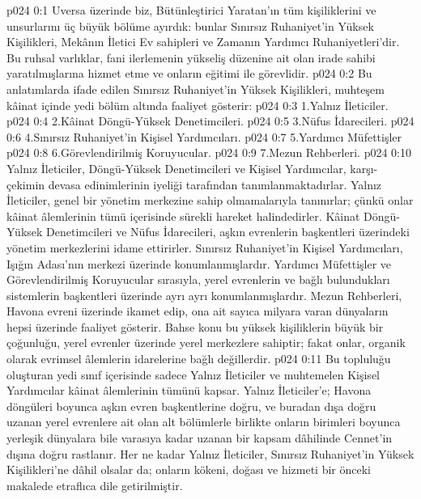 \vs p024 0:1 Uversa üzerinde biz, Bütünleştirici Yaratan’ın tüm kişiliklerini ve unsurlarını üç büyük bölüme ayırdık: bunlar Sınırsız Ruhaniyet’in Yüksek Kişilikleri, Mekânın İletici Ev sahipleri ve Zamanın Yardımcı Ruhaniyetleri’dir. Bu ruhsal varlıklar, fani ilerlemenin yükseliş düzenine ait olan irade sahibi yaratılmışlarına hizmet etme ve onların eğitimi ile görevlidir.
\vs p024 0:2 Bu anlatımlarda ifade edilen Sınırsız Ruhaniyet’in Yüksek Kişilikleri, muhteşem kâinat içinde yedi bölüm altında faaliyet gösterir:
\vs p024 0:3 1.\bibnobreakspace Yalnız İleticiler.
\vs p024 0:4 2.\bibnobreakspace Kâinat Döngü\hyp{}Yüksek Denetimcileri.
\vs p024 0:5 3.\bibnobreakspace Nüfus İdarecileri.
\vs p024 0:6 4.\bibnobreakspace Sınırsız Ruhaniyet’in Kişisel Yardımcıları.
\vs p024 0:7 5.\bibnobreakspace Yardımcı Müfettişler
\vs p024 0:8 6.\bibnobreakspace Görevlendirilmiş Koruyucular.
\vs p024 0:9 7.\bibnobreakspace Mezun Rehberleri.
\vs p024 0:10 Yalnız İleticiler, Döngü\hyp{}Yüksek Denetimcileri ve Kişisel Yardımcılar, karşı\hyp{}çekimin devasa edinimlerinin iyeliği tarafından tanımlanmaktadırlar. Yalnız İleticiler, genel bir yönetim merkezine sahip olmamalarıyla tanınırlar; çünkü onlar kâinat âlemlerinin tümü içerisinde sürekli hareket halindedirler. Kâinat Döngü\hyp{}Yüksek Denetimcileri ve Nüfus İdarecileri, aşkın evrenlerin başkentleri üzerindeki yönetim merkezlerini idame ettirirler. Sınırsız Ruhaniyet’in Kişisel Yardımcıları, Işığın Adası’nın merkezi üzerinde konumlanmışlardır. Yardımcı Müfettişler ve Görevlendirilmiş Koruyucular sırasıyla, yerel evrenlerin ve bağlı bulundukları sistemlerin başkentleri üzerinde ayrı ayrı konumlanmışlardır. Mezun Rehberleri, Havona evreni üzerinde ikamet edip, ona ait sayıca milyara varan dünyaların hepsi üzerinde faaliyet gösterir. Bahse konu bu yüksek kişiliklerin büyük bir çoğunluğu, yerel evrenler üzerinde yerel merkezlere sahiptir; fakat onlar, organik olarak evrimsel âlemlerin idarelerine bağlı değillerdir.
\vs p024 0:11 Bu topluluğu oluşturan yedi sınıf içerisinde sadece Yalnız İleticiler ve muhtemelen Kişisel Yardımcılar kâinat âlemlerinin tümünü kapsar. Yalnız İleticiler’e; Havona döngüleri boyunca aşkın evren başkentlerine doğru, ve buradan dışa doğru uzanan yerel evrenlere ait olan alt bölümlerle birlikte onların birimleri boyunca yerleşik dünyalara bile varasıya kadar uzanan bir kapsam dâhilinde Cennet’in dışına doğru rastlanır. Her ne kadar Yalnız İleticiler, Sınırsız Ruhaniyet’in Yüksek Kişilikleri’ne dâhil olsalar da; onların kökeni, doğası ve hizmeti bir önceki makalede etraflıca dile getirilmiştir.

